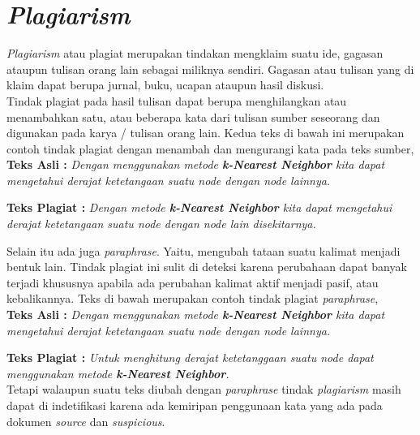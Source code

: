\documentclass[../Proposal.tex]{subfiles}
\begin{document}
	\section{\textit{Plagiarism}}
	\textit{Plagiarism} atau plagiat merupakan tindakan mengklaim suatu ide, gagasan ataupun tulisan orang lain sebagai miliknya sendiri. Gagasan atau tulisan yang di klaim dapat berupa jurnal, buku, ucapan ataupun hasil diskusi. \\
	
	\noindent Tindak plagiat pada hasil tulisan dapat berupa menghilangkan atau menambahkan satu, atau beberapa kata dari tulisan sumber seseorang dan digunakan pada karya / tulisan orang lain\cite{panduan-anti-plagiarisme}. Kedua teks di bawah ini merupakan contoh tindak plagiat dengan menambah dan mengurangi kata pada teks sumber, \\
	
	\indent \textbf{Teks Asli : } \textit{Dengan menggunakan metode \textbf{\textit{k-Nearest Neighbor}} kita dapat mengetahui derajat ketetangaan suatu \textit{node} dengan \textit{node} lainnya.}
	
	\indent \textbf{Teks Plagiat : } \textit{Dengan metode \textbf{\textit{k-Nearest Neighbor}} kita dapat mengetahui derajat ketetangaan suatu \textit{node} dengan \textit{node} lain disekitarnya. \\}
	
	\noindent Selain itu ada juga \textit{paraphrase}. Yaitu, mengubah tataan suatu kalimat menjadi bentuk lain. Tindak plagiat ini sulit di deteksi karena perubahaan dapat banyak terjadi khususnya apabila ada perubahan kalimat aktif menjadi pasif, atau kebalikannya. Teks di bawah merupakan contoh tindak plagiat \textit{paraphrase}, \\
	
	\indent \textbf{Teks Asli : } \textit{Dengan menggunakan metode \textbf{\textit{k-Nearest Neighbor}} kita dapat mengetahui derajat ketetangaan suatu \textit{node} dengan \textit{node} lainnya.}
	
	\indent \textbf{Teks Plagiat : } \textit{Untuk menghitung derajat ketetanggaan suatu \textit{node} dapat menggunakan metode \textbf{\textit{k-Nearest Neighbor}}.} \\
	
	\noindent Tetapi walaupun suatu teks diubah dengan \textit{paraphrase} tindak \textit{plagiarism} masih dapat di indetifikasi karena ada kemiripan penggunaan kata yang ada pada dokumen \textit{source} dan \textit{suspicious}.
\end{document}
